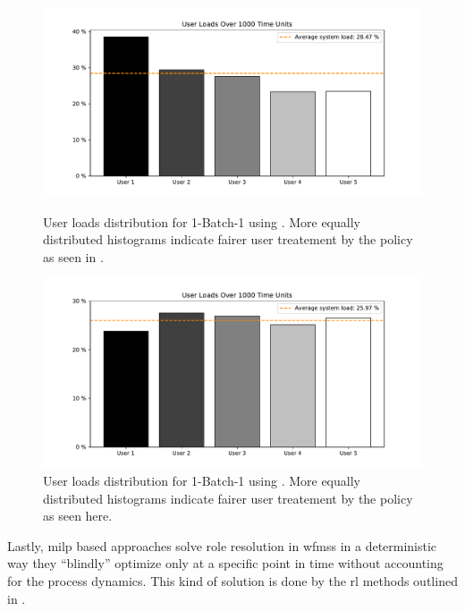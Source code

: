 \begin{figure}[!ht]
	\centering
	\begin{minipage}[b]{0.45\textwidth}
		\includegraphics[width=\textwidth]{img/1_BATCHONE_MSA_NU5_GI3_SIM1000_FAIR}
		\caption{User loads distribution for 1-Batch-1 using . More equally distributed histograms indicate fairer user treatement by the policy as seen in .}
		\label{fig:msa_fairness}
	\end{minipage}
	\hfill
	\begin{minipage}[b]{0.45\textwidth}
		\includegraphics[width=\textwidth]{img/1_BATCHONE_ST_NU5_GI3_SIM1000_FAIR}
		\caption{User loads distribution for 1-Batch-1 using . More equally distributed histograms indicate fairer user treatement by the policy as seen here.}
		\label{fig:st_fairness}
	\end{minipage}
\end{figure}

Lastly, \gls{milp} based approaches solve role resolution in \glspl{wfms} in a deterministic way \ie they ``blindly'' optimize only at a specific point in time without accounting for the process dynamics. This kind of solution is done by the \gls{rl} methods outlined in .

